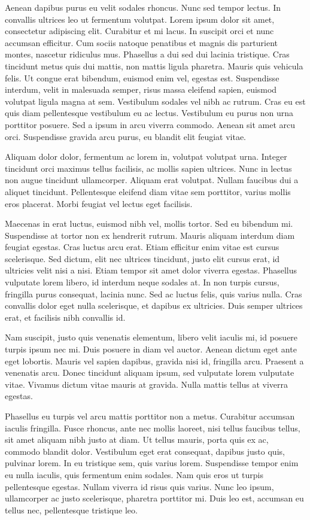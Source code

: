 Aenean dapibus purus eu velit sodales rhoncus. Nunc sed tempor lectus. In convallis ultrices leo ut fermentum volutpat.
Lorem ipsum dolor sit amet, consectetur adipiscing elit. Curabitur et mi lacus. In suscipit orci et nunc accumsan efficitur. Cum sociis natoque penatibus et magnis dis parturient montes, nascetur ridiculus mus. Phasellus a dui sed dui lacinia tristique. Cras tincidunt metus quis dui mattis, non mattis ligula pharetra. Mauris quis vehicula felis. Ut congue erat bibendum, euismod enim vel, egestas est. Suspendisse interdum, velit in malesuada semper, risus massa eleifend sapien, euismod volutpat ligula magna at sem. Vestibulum sodales vel nibh ac rutrum. Cras eu est quis diam pellentesque vestibulum eu ac lectus. Vestibulum eu purus non urna porttitor posuere. Sed a ipsum in arcu viverra commodo. Aenean sit amet arcu orci. Suspendisse gravida arcu purus, eu blandit elit feugiat vitae.

Aliquam dolor dolor, fermentum ac lorem in, volutpat volutpat urna. Integer tincidunt orci maximus tellus facilisis, ac mollis sapien ultrices. Nunc in lectus non augue tincidunt ullamcorper. Aliquam erat volutpat. Nullam faucibus dui a aliquet tincidunt. Pellentesque eleifend diam vitae sem porttitor, varius mollis eros placerat. Morbi feugiat vel lectus eget facilisis.

Maecenas in erat luctus, euismod nibh vel, mollis tortor. Sed eu bibendum mi. Suspendisse at tortor non ex hendrerit rutrum. Mauris aliquam interdum diam feugiat egestas. Cras luctus arcu erat. Etiam efficitur enim vitae est cursus scelerisque. Sed dictum, elit nec ultrices tincidunt, justo elit cursus erat, id ultricies velit nisi a nisi. Etiam tempor sit amet dolor viverra egestas. Phasellus vulputate lorem libero, id interdum neque sodales at. In non turpis cursus, fringilla purus consequat, lacinia nunc. Sed ac luctus felis, quis varius nulla. Cras convallis dolor eget nulla scelerisque, et dapibus ex ultricies. Duis semper ultrices erat, et facilisis nibh convallis id.

Nam suscipit, justo quis venenatis elementum, libero velit iaculis mi, id posuere turpis ipsum nec mi. Duis posuere in diam vel auctor. Aenean dictum eget ante eget lobortis. Mauris vel sapien dapibus, gravida nisi id, fringilla arcu. Praesent a venenatis arcu. Donec tincidunt aliquam ipsum, sed vulputate lorem vulputate vitae. Vivamus dictum vitae mauris at gravida. Nulla mattis tellus at viverra egestas.

Phasellus eu turpis vel arcu mattis porttitor non a metus. Curabitur accumsan iaculis fringilla. Fusce rhoncus, ante nec mollis laoreet, nisi tellus faucibus tellus, sit amet aliquam nibh justo at diam. Ut tellus mauris, porta quis ex ac, commodo blandit dolor. Vestibulum eget erat consequat, dapibus justo quis, pulvinar lorem. In eu tristique sem, quis varius lorem. Suspendisse tempor enim eu nulla iaculis, quis fermentum enim sodales. Nam quis eros ut turpis pellentesque egestas. Nullam viverra id risus quis varius. Nunc leo ipsum, ullamcorper ac justo scelerisque, pharetra porttitor mi. Duis leo est, accumsan eu tellus nec, pellentesque tristique leo.

